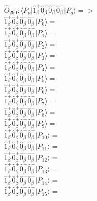 \documentclass[14pt]{article}
\begin{document}
    $\hat{O}_{290}:  \langle{P_p}\vert \hat{1}_{\beta}^{+}\hat{0}_{\beta}^{+}\hat{0}_{\beta}^{-}\hat{0}_{\beta}^{-} \vert{P_q}\rangle => $ \\ 
    $ \hat{1}_{\beta}^{+}\hat{0}_{\beta}^{+}\hat{0}_{\beta}^{-}\hat{0}_{\beta}^{-} \vert{P_{0}}\rangle =  $ \\ 
    $ \hat{1}_{\beta}^{+}\hat{0}_{\beta}^{+}\hat{0}_{\beta}^{-}\hat{0}_{\beta}^{-} \vert{P_{1}}\rangle =  $ \\ 
    $ \hat{1}_{\beta}^{+}\hat{0}_{\beta}^{+}\hat{0}_{\beta}^{-}\hat{0}_{\beta}^{-} \vert{P_{2}}\rangle =  $ \\ 
    $ \hat{1}_{\beta}^{+}\hat{0}_{\beta}^{+}\hat{0}_{\beta}^{-}\hat{0}_{\beta}^{-} \vert{P_{3}}\rangle =  $ \\ 
    $ \hat{1}_{\beta}^{+}\hat{0}_{\beta}^{+}\hat{0}_{\beta}^{-}\hat{0}_{\beta}^{-} \vert{P_{4}}\rangle =  $ \\ 
    $ \hat{1}_{\beta}^{+}\hat{0}_{\beta}^{+}\hat{0}_{\beta}^{-}\hat{0}_{\beta}^{-} \vert{P_{5}}\rangle =  $ \\ 
    $ \hat{1}_{\beta}^{+}\hat{0}_{\beta}^{+}\hat{0}_{\beta}^{-}\hat{0}_{\beta}^{-} \vert{P_{6}}\rangle =  $ \\ 
    $ \hat{1}_{\beta}^{+}\hat{0}_{\beta}^{+}\hat{0}_{\beta}^{-}\hat{0}_{\beta}^{-} \vert{P_{7}}\rangle =  $ \\ 
    $ \hat{1}_{\beta}^{+}\hat{0}_{\beta}^{+}\hat{0}_{\beta}^{-}\hat{0}_{\beta}^{-} \vert{P_{8}}\rangle =  $ \\ 
    $ \hat{1}_{\beta}^{+}\hat{0}_{\beta}^{+}\hat{0}_{\beta}^{-}\hat{0}_{\beta}^{-} \vert{P_{9}}\rangle =  $ \\ 
    $ \hat{1}_{\beta}^{+}\hat{0}_{\beta}^{+}\hat{0}_{\beta}^{-}\hat{0}_{\beta}^{-} \vert{P_{10}}\rangle =  $ \\ 
    $ \hat{1}_{\beta}^{+}\hat{0}_{\beta}^{+}\hat{0}_{\beta}^{-}\hat{0}_{\beta}^{-} \vert{P_{11}}\rangle =  $ \\ 
    $ \hat{1}_{\beta}^{+}\hat{0}_{\beta}^{+}\hat{0}_{\beta}^{-}\hat{0}_{\beta}^{-} \vert{P_{12}}\rangle =  $ \\ 
    $ \hat{1}_{\beta}^{+}\hat{0}_{\beta}^{+}\hat{0}_{\beta}^{-}\hat{0}_{\beta}^{-} \vert{P_{13}}\rangle =  $ \\ 
    $ \hat{1}_{\beta}^{+}\hat{0}_{\beta}^{+}\hat{0}_{\beta}^{-}\hat{0}_{\beta}^{-} \vert{P_{14}}\rangle =  $ \\ 
    $ \hat{1}_{\beta}^{+}\hat{0}_{\beta}^{+}\hat{0}_{\beta}^{-}\hat{0}_{\beta}^{-} \vert{P_{15}}\rangle =  $ \\ 
    
\end{document}
